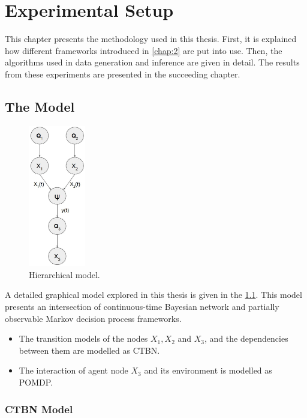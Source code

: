 
\chapter{Experimental Setup}

This chapter presents the methodology used in this thesis. First, it is explained how different frameworks introduced in \cref{chap:2} are put into use. Then, the algorithms used in data generation and inference are given in detail. The results from these experiments are presented in the succeeding chapter.

\section{The Model}
\begin{figure}
	\begin{center}
		\includegraphics[width=2.5cm]{figures/h_model}
		\caption{Hierarchical model.}
	\end{center}
	\label{fig:h_model}
\end{figure} 
A detailed graphical model explored in this thesis is given in the \cref{fig:h_model}. This model presents an intersection of continuous-time Bayesian network and partially observable Markov decision process frameworks. 
\begin{itemize}
	\item The transition models of the nodes $ X_1, X_2$ and $ X_3 $, and the dependencies between them are modelled as CTBN.
	\item The interaction of agent node $ X_3 $ and its environment is modelled as POMDP.
\end{itemize}

\subsection{CTBN Model}

